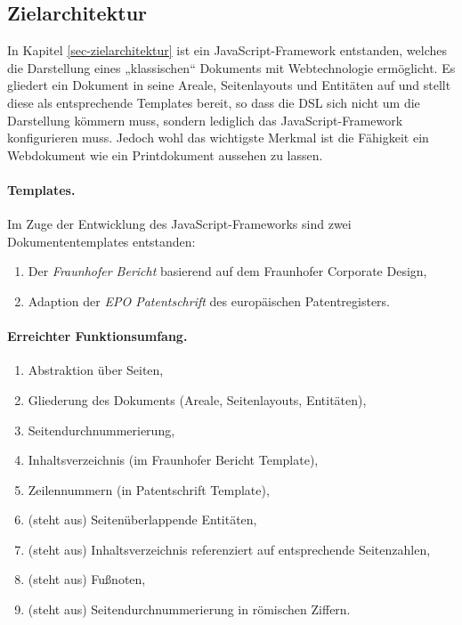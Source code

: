 \subsection{Zielarchitektur}

In Kapitel \ref{sec-zielarchitektur} ist ein JavaScript-Framework entstanden,
welches die Darstellung eines „klassischen“ Dokuments mit Webtechnologie
ermöglicht.
Es gliedert ein Dokument in seine Areale, Seitenlayouts und Entitäten auf
und stellt diese als entsprechende Templates bereit, so dass die DSL sich
nicht um die Darstellung kömmern muss, sondern lediglich das
JavaScript-Framework konfigurieren muss.
Jedoch wohl das wichtigste Merkmal ist die Fähigkeit ein Webdokument wie
ein Printdokument aussehen zu lassen.

\paragraph{Templates.}
Im Zuge der Entwicklung des JavaScript-Frameworks sind zwei Dokumententemplates
entstanden:

\begin{enumerate}
  \item Der \emph{Fraunhofer Bericht} basierend auf dem
        Fraunhofer Corporate Design,
  \item Adaption der \emph{EPO Patentschrift} des europäischen Patentregisters.
\end{enumerate}

\paragraph{Erreichter Funktionsumfang.}

\def\erreichtZielarchi{
\begin{enumerate}
  \item Abstraktion über Seiten,
  \item Gliederung des Dokuments (Areale, Seitenlayouts, Entitäten),
  \item Seitendurchnummerierung,
  \item Inhaltsverzeichnis (im Fraunhofer Bericht Template),
  \item Zeilennummern (in Patentschrift Template),
  \item (steht aus) Seitenüberlappende Entitäten,
  \item (steht aus) Inhaltsverzeichnis referenziert auf entsprechende Seitenzahlen,
  \item (steht aus) Fußnoten,
  \item (steht aus) Seitendurchnummerierung in römischen Ziffern.
\end{enumerate}
}
\erreichtZielarchi

